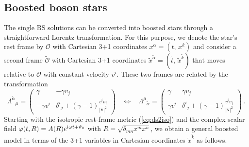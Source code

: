\documentclass[]{iopart}
\renewcommand{\vec}[1]{\boldsymbol{#1}}
\newcommand{\iu}{\mathrm{i}\mkern1mu}
\begin{document}
\subsection{Boosted boson stars}
%
The single BS solutions can be converted into boosted stars through
a straightforward Lorentz transformation. For this purpose, we
denote the star's rest frame by $\mathcal{O}$ with Cartesian 3+1
coordinates $x^{\alpha}=(t,\,x^k)$ and consider a second frame
$\tilde{\mathcal{O}}$ with Cartesian 3+1 coordinates
$\tilde{x}^{\tilde{\alpha}}=(\tilde{t},\,\tilde{x}^{\tilde{k}})$
that moves relative to $\mathcal{O}$ with constant velocity $v^i$.
These two frames are related by the transformation
%
\begin{equation}
  \Lambda^{\tilde{\alpha}}{}_{\mu} = \left( \begin{array}{c|c}
        \gamma & -\gamma v_j \\
        \hline
        -\gamma v^i & \delta^i{}_j+(\gamma-1)\frac{v^i v_j}{|\vec{v}|^2}
  \end{array} \right)~~~~\Leftrightarrow~~~~
  \Lambda^{\mu}{}_{\tilde{\alpha}} = \left( \begin{array}{c|c}
        \gamma & \gamma v_j \\
        \hline
        \gamma v^i & \delta^i{}_j+(\gamma-1)\frac{v^i v_j}{|\vec{v}|^2}
  \end{array} \right)
  \,.
  \nonumber
\end{equation}
%
Starting with the isotropic rest-frame metric (\ref{eq:ds2iso}) and
the complex scalar field $\varphi(t,R)=A(R)e^{\iu \omega t +
\vartheta_0}$ with $R=\sqrt{\delta_{mn}x^mx^n}$, we obtain a general
boosted model in terms of the 3+1 variables in Cartesian coordinates
$\tilde{x}^{\tilde{k}}$ as follows.
%
\end{document}
